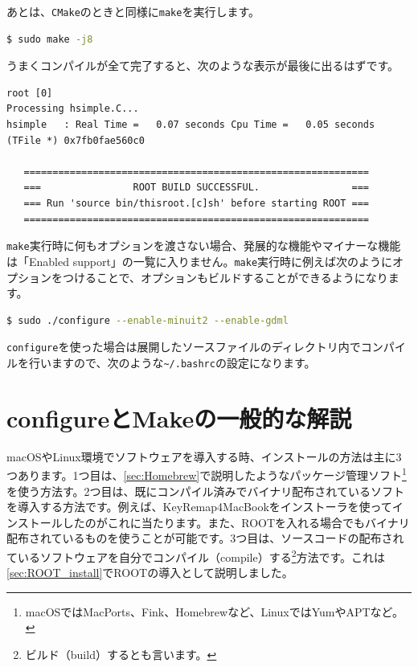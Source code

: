 あとは、\texttt{CMake}のときと同様に\texttt{make}を実行します。
\begin{lstlisting}[language=bash]
$ sudo make -j8
\end{lstlisting}
うまくコンパイルが全て完了すると、次のような表示が最後に出るはずです。
\begin{lstlisting}
root [0] 
Processing hsimple.C...
hsimple   : Real Time =   0.07 seconds Cpu Time =   0.05 seconds
(TFile *) 0x7fb0fae560c0
 
   ============================================================
   ===                ROOT BUILD SUCCESSFUL.                ===
   === Run 'source bin/thisroot.[c]sh' before starting ROOT ===
   ============================================================
\end{lstlisting}

\texttt{make}実行時に何もオプションを渡さない場合、発展的な機能やマイナーな機能は「Enabled support」の一覧に入りません。\texttt{make}実行時に例えば次のようにオプションをつけることで、オプションもビルドすることができるようになります。

\begin{lstlisting}[language=bash]
$ sudo ./configure --enable-minuit2 --enable-gdml
\end{lstlisting}

\texttt{configure}を使った場合は展開したソースファイルのディレクトリ内でコンパイルを行いますので、次のような\texttt{\~{}/.bashrc}の設定になります。
\begin{NoFloat}

\end{NoFloat}

\section{configureとMakeの一般的な解説}

macOSやLinux環境でソフトウェアを導入する時、インストールの方法は主に3つあります。1つ目は、\ref{sec:Homebrew}で説明したようなパッケージ管理ソフト\footnote{macOSではMacPorts、Fink、Homebrewなど、LinuxではYumやAPTなど。}を使う方法す。2つ目は、既にコンパイル済みでバイナリ配布されているソフトを導入する方法です。例えば、KeyRemap4MacBookをインストーラを使ってインストールしたのがこれに当たります。また、ROOTを入れる場合でもバイナリ配布されているものを使うことが可能です。3つ目は、ソースコードの配布されているソフトウェアを自分でコンパイル（compile）する\footnote{ビルド（build）するとも言います。}方法です。これは\ref{sec:ROOT_install}でROOTの導入として説明しました。


